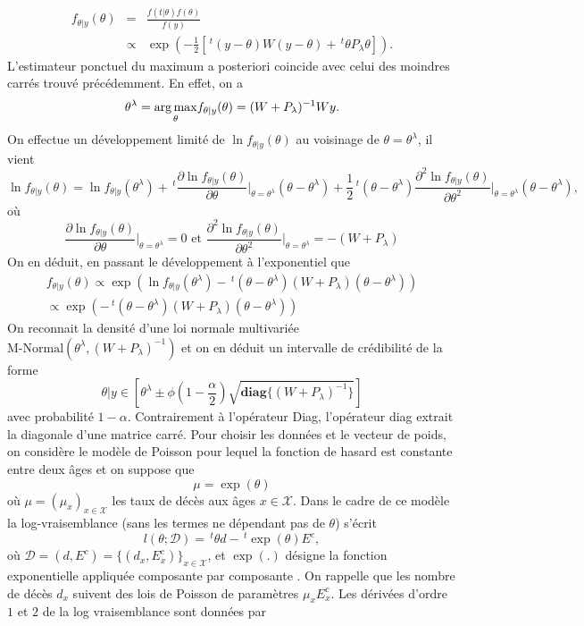 \begin{eqnarray*}
f_{\theta|y }(\theta)&=&\frac{f(t|\theta)f(\theta)}{f(y)}\\
&\propto&\exp\left(-\frac{1}{2}\left[\,^t(y-\theta)W(y-\theta)+\,^t\theta P_{\lambda}\theta\right]\right).
\end{eqnarray*}
L'estimateur ponctuel du maximum a posteriori coincide avec celui des moindres carrés trouvé précédemment. En effet, on a 
$$
\theta^\lambda = \underset{\theta}{\operatorname*{arg\,max}} f_{\theta|y }(\theta) = (W+P_\lambda)^{-1}Wy.
$$
On effectue un développement limité de $\ln f_{\theta|y}(\theta)$ au voisinage de $\theta=\theta^\lambda$, il vient 
$$
\ln f_{\theta|y }(\theta) = \ln f_{\theta|y }(\theta^\lambda) + \,^t\frac{\partial\ln f_{\theta|y }(\theta)}{\partial\theta}\Big\rvert_{\theta = \theta^\lambda}(\theta-\theta^\lambda) + \frac{1}{2}\,^t(\theta-\theta^\lambda)\frac{\partial^2\ln f_{\theta|y }(\theta)}{\partial\theta^2}\Big\rvert_{\theta = \theta^\lambda}(\theta-\theta^\lambda),
$$
où
$$
\frac{\partial\ln f_{\theta|y }(\theta)}{\partial\theta}\Big\rvert_{\theta = \theta^\lambda}=0\text{ et }\frac{\partial^2\ln f_{\theta|y }(\theta)}{\partial\theta^2}\Big\rvert_{\theta = \theta^\lambda} = -(W+P_\lambda)
$$
On en déduit, en passant le développement à l'exponentiel que
\begin{eqnarray*}
f_{\theta|y }(\theta)\propto  \exp\left(\ln f_{\theta|y }(\theta^\lambda) -\,^t(\theta-\theta^\lambda)(W+P_\lambda)(\theta-\theta^\lambda) \right)\\
\propto  \exp\left( -\,^t(\theta-\theta^\lambda)(W+P_\lambda)(\theta-\theta^\lambda) \right)
\end{eqnarray*}
On reconnait la densité d'une loi normale multivariée $\text{M-Normal}(\theta^\lambda, (W+P_\lambda)^{-1})$ et on en déduit un intervalle de crédibilité de la forme 
$$
\theta|y\in\left[\theta^\lambda\pm \phi\left(1-\frac{\alpha}{2}\right)\sqrt{\textbf{diag}\{(W+P_\lambda)^{-1}\}}\right]
$$
avec probabilité $1-\alpha$. Contrairement à l'opérateur Diag, l'opérateur diag extrait la diagonale d'une matrice carré. Pour choisir les données et le vecteur de poids, on considère le modèle de Poisson pour lequel la fonction de hasard est constante entre deux âges et on suppose que 
$$
\mu = \exp(\theta)
$$
où $\mu = (\mu_x)_{x\in\mathcal{X}}$ les taux de décès aux âges $x\in\mathcal{X}$. Dans le cadre de ce modèle la log-vraisemblance (sans les termes ne dépendant pas de $\theta$) s'écrit 
$$
l(\theta;\mathcal{D}) = \,^t\theta d - \,^t\exp(\theta)E^c,
$$
où $\mathcal{D} = (d,E^c) = \{(d_x,E^c_x)\}_{x\in\mathcal{X}}$, et $\exp(.)$ désigne la fonction exponentielle appliquée composante par composante . On rappelle que les nombre de décès $d_x$ suivent des lois de Poisson de paramètres $\mu_x E_x^c$. Les dérivées d'ordre $1$ et $2$ de la log vraisemblance sont données par 
